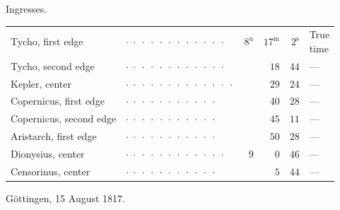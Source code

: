 \par\indent Ingresses.
\begin{center}\fontsize{10}{12}\selectfont\setlength{\tabcolsep}{3pt}\begin{tabular}{llrrrl}
Tycho, first edge & $\cdot\;\cdot\;\cdot\;\cdot\;\cdot\;\cdot\;\cdot\;\cdot\;\cdot\;\cdot\;\cdot\;\cdot$ &  $8^{\mathrm u}$ & $17^{\mathrm m}$ & $2^{\mathrm s}$ & \shortstack{True\\time}\\
Tycho, second edge & $\cdot\;\cdot\;\cdot\;\cdot\;\cdot\;\cdot\;\cdot\;\cdot\;\cdot\;\cdot\;\cdot\;\cdot$ &  & $18$ & $44$ & —\\
Kepler, center & $\cdot\;\cdot\;\cdot\;\cdot\;\cdot\;\cdot\;\cdot\;\cdot\;\cdot\;\cdot\;\cdot\;\cdot\;\cdot$ &  & $29$ & $24$ & —\\
Copernicus, first edge & $\cdot\;\cdot\;\cdot\;\cdot\;\cdot\;\cdot\;\cdot\;\cdot\;\cdot\;\cdot\;\cdot$ &  & $40$ & $28$ & —\\
Copernicus, second edge & $\cdot\;\cdot\;\cdot\;\cdot\;\cdot\;\cdot\;\cdot\;\cdot\;\cdot\;\cdot\;\cdot$ &  & $45$ & $11$ & —\\
Aristarch, first edge & $\cdot\;\cdot\;\cdot\;\cdot\;\cdot\;\cdot\;\cdot\;\cdot\;\cdot\;\cdot\;\cdot$ &  & $50$ & $28$ & —\\
Dionysius, center & $\cdot\;\cdot\;\cdot\;\cdot\;\cdot\;\cdot\;\cdot\;\cdot\;\cdot\;\cdot\;\cdot\;\cdot$ &  $9$ & $0$ & $46$ & —\\
Censorinus, center & $\cdot\;\cdot\;\cdot\;\cdot\;\cdot\;\cdot\;\cdot\;\cdot\;\cdot\;\cdot\;\cdot$ &  & $5$ & $44$ & —\\
\end{tabular}\end{center}

\begin{flushright}Göttingen, 15 August 1817.\end{flushright}

